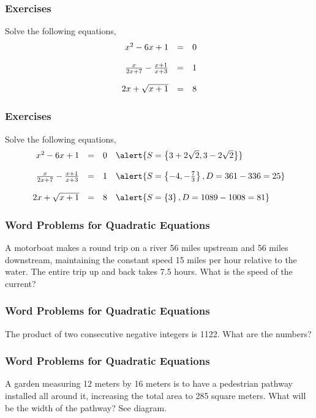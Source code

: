 \documentclass[xcolor=dvipsnames]{beamer}
\begin{document}
\begin{frame}
  \frametitle{Exercises}
{\ubung} Solve the following equations,
\begin{equation}
  \label{eq:koaseich}
  \begin{array}{rcl}
    x^{2}-6x+1&=&0 \\
\hspace{.5in} && \\
    \frac{x}{2x+7}-\frac{x+1}{x+3}&=&1 \\
\hspace{.5in} && \\
    2x+\sqrt{x+1}&=&8 
  \end{array}
\end{equation}
\end{frame}

\begin{frame}
  \frametitle{Exercises}
  \addtocounter{exercise}{-1}
{\ubung} Solve the following equations,
\begin{equation}
  \label{eq:neeshouw}
  \begin{array}{rcll}
    x^{2}-6x+1&=&0&\alert{S=\left\{3+2\sqrt{2},3-2\sqrt{2}\right\}} \\
\hspace{.5in} && \\
    \frac{x}{2x+7}-\frac{x+1}{x+3}&=&1&\alert{S=\left\{-4,-\frac{7}{3}\right\},D=361-336=25} \\
\hspace{.5in} && \\
    2x+\sqrt{x+1}&=&8&\alert{S=\left\{3\right\},D=1089-1008=81}
  \end{array}
\end{equation}
\end{frame}

\begin{frame}
  \frametitle{Word Problems for Quadratic Equations}
{\ubung} A motorboat makes a round trip on a river 56 miles upstream and 56
miles downstream, maintaining the constant speed 15 miles per hour
relative to the water. The entire trip up and back takes 7.5 hours.
What is the speed of the current?
\end{frame}

\begin{frame}
  \frametitle{Word Problems for Quadratic Equations}
{\ubung} The product of two consecutive negative integers is 1122. What are
the numbers?
\end{frame}

\begin{frame}
  \frametitle{Word Problems for Quadratic Equations}
{\ubung} A garden measuring 12 meters by 16 meters is to have a pedestrian
pathway installed all around it, increasing the total area to 285
square meters. What will be the width of the pathway? See diagram.
\end{frame}
\end{document}
